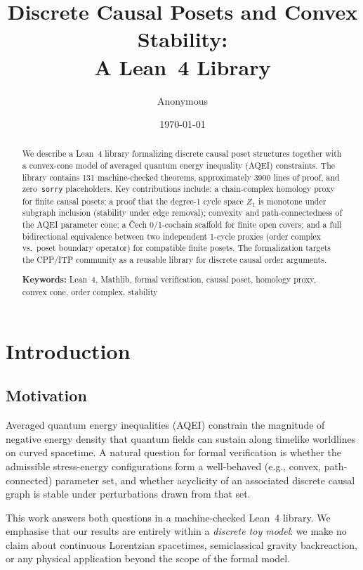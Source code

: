 \documentclass[12pt]{article}
\title{Discrete Causal Posets and Convex Stability:\\A Lean~4 Library}
\author{Anonymous}
\date{\today}
\begin{document}
\maketitle

\begin{abstract}
We describe a Lean~4 library formalizing discrete causal poset structures together
with a convex-cone model of averaged quantum energy inequality (AQEI) constraints.
The library contains 131\xspace machine-checked theorems, approximately 3900\xspace
lines of proof, and zero~\texttt{sorry} placeholders.
Key contributions include: a chain-complex homology proxy for finite causal posets;
a proof that the degree-1 cycle space $Z_1$ is monotone under subgraph inclusion
(stability under edge removal); convexity and path-connectedness of the AQEI
parameter cone; a Čech 0/1-cochain scaffold for finite open covers; and a full
bidirectional equivalence between two independent 1-cycle proxies (order complex
vs.\ poset boundary operator) for compatible finite posets.
The formalization targets the CPP/ITP community as a reusable library for
discrete causal order arguments.

\noindent \textbf{Keywords:} Lean~4, Mathlib, formal verification, causal poset,
homology proxy, convex cone, order complex, stability
\end{abstract}

\section{Introduction}

\subsection{Motivation}

Averaged quantum energy inequalities (AQEI) constrain the magnitude of negative
energy density that quantum fields can sustain along timelike worldlines on curved
spacetime\cite{fewster2012averaged}.  A natural question for formal verification
is whether the admissible stress-energy configurations form a well-behaved
(e.g., convex, path-connected) parameter set, and whether acyclicity of an
associated discrete causal graph is stable under perturbations drawn from that set.

This work answers both questions in a machine-checked Lean~4 library.  We
emphasise that our results are entirely within a \emph{discrete toy model}:
we make no claim about continuous Lorentzian spacetimes, semiclassical gravity
backreaction, or any physical application beyond the scope of the formal model.
\end{document}
